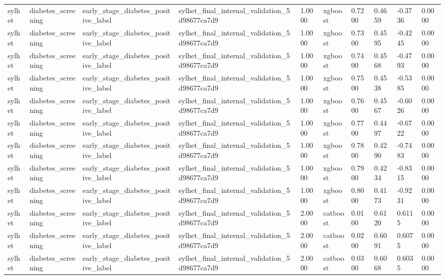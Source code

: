 \begin{tabular}{llllllllll}
sylhet & diabetes\_screening & early\_stage\_diabetes\_positive\_label & sylhet\_final\_internal\_validation\_5d98677ca7d9 & 1.0000 & xgboost & 0.7200 & 0.4659 & -0.3736 & 0.0000 \\
sylhet & diabetes\_screening & early\_stage\_diabetes\_positive\_label & sylhet\_final\_internal\_validation\_5d98677ca7d9 & 1.0000 & xgboost & 0.7300 & 0.4595 & -0.4245 & 0.0000 \\
sylhet & diabetes\_screening & early\_stage\_diabetes\_positive\_label & sylhet\_final\_internal\_validation\_5d98677ca7d9 & 1.0000 & xgboost & 0.7400 & 0.4568 & -0.4793 & 0.0000 \\
sylhet & diabetes\_screening & early\_stage\_diabetes\_positive\_label & sylhet\_final\_internal\_validation\_5d98677ca7d9 & 1.0000 & xgboost & 0.7500 & 0.4538 & -0.5385 & 0.0000 \\
sylhet & diabetes\_screening & early\_stage\_diabetes\_positive\_label & sylhet\_final\_internal\_validation\_5d98677ca7d9 & 1.0000 & xgboost & 0.7600 & 0.4567 & -0.6026 & 0.0000 \\
sylhet & diabetes\_screening & early\_stage\_diabetes\_positive\_label & sylhet\_final\_internal\_validation\_5d98677ca7d9 & 1.0000 & xgboost & 0.7700 & 0.4497 & -0.6722 & 0.0000 \\
sylhet & diabetes\_screening & early\_stage\_diabetes\_positive\_label & sylhet\_final\_internal\_validation\_5d98677ca7d9 & 1.0000 & xgboost & 0.7800 & 0.4290 & -0.7483 & 0.0000 \\
sylhet & diabetes\_screening & early\_stage\_diabetes\_positive\_label & sylhet\_final\_internal\_validation\_5d98677ca7d9 & 1.0000 & xgboost & 0.7900 & 0.4234 & -0.8315 & 0.0000 \\
sylhet & diabetes\_screening & early\_stage\_diabetes\_positive\_label & sylhet\_final\_internal\_validation\_5d98677ca7d9 & 1.0000 & xgboost & 0.8000 & 0.4173 & -0.9231 & 0.0000 \\
sylhet & diabetes\_screening & early\_stage\_diabetes\_positive\_label & sylhet\_final\_internal\_validation\_5d98677ca7d9 & 2.0000 & catboost & 0.0100 & 0.6120 & 0.6115 & 0.0000 \\
sylhet & diabetes\_screening & early\_stage\_diabetes\_positive\_label & sylhet\_final\_internal\_validation\_5d98677ca7d9 & 2.0000 & catboost & 0.0200 & 0.6091 & 0.6075 & 0.0000 \\
sylhet & diabetes\_screening & early\_stage\_diabetes\_positive\_label & sylhet\_final\_internal\_validation\_5d98677ca7d9 & 2.0000 & catboost & 0.0300 & 0.6068 & 0.6035 & 0.0000 \\

\end{tabular}
